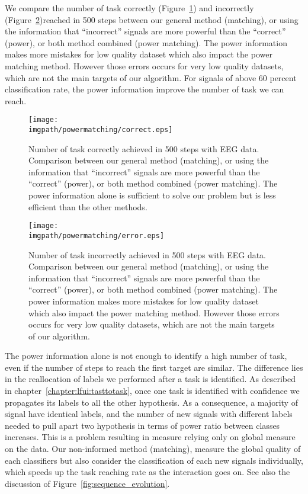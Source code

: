 We compare the number of task correctly (Figure~\ref{fig:nCorrect_powermatching}) and incorrectly (Figure~\ref{fig:nWrongEEG_powermatching})reached in 500 steps between our general method (matching), or using the information that ``incorrect'' signals are more powerful than the ``correct'' (power), or both method combined (power matching). The power information makes more mistakes for low quality dataset which also impact the power matching method. However those errors occurs for very low quality datasets, which are not the main targets of our algorithm. For signals of above 60 percent classification rate, the power information improve the number of task we can reach. 

\begin{figure}[!ht]
\centering
\texttt{[image: \\imgpath/powermatching/correct.eps]}
\caption{Number of task correctly achieved in 500 steps with EEG data. Comparison between our general method (matching), or using the information that ``incorrect'' signals are more powerful than the ``correct'' (power), or both method combined (power matching). The power information alone is sufficient to solve our problem but is less efficient than the other methods.}
\label{fig:nCorrect_powermatching}
\end{figure} 

\begin{figure}[!ht]
\centering
\texttt{[image: \\imgpath/powermatching/error.eps]}
\caption{Number of task incorrectly achieved in 500 steps with EEG data. Comparison between our general method (matching), or using the information that ``incorrect'' signals are more powerful than the ``correct'' (power), or both method combined (power matching). The power information makes more mistakes for low quality dataset which also impact the power matching method. However those errors occurs for very low quality datasets, which are not the main targets of our algorithm.}
\label{fig:nWrongEEG_powermatching}
\end{figure} 


The power information alone is not enough to identify a high number of task, even if the number of steps to reach the first target are similar. The difference lies in the reallocation of labels we performed after a task is identified. As described in chapter~\ref{chapter:lfui:tasttotask}, once one task is identified with confidence we propagates its labels to all the other hypothesis. As a consequence, a majority of signal have identical labels, and the number of new signals with different labels needed to pull apart two hypothesis in terms of power ratio between classes increases. This is a problem resulting in measure relying only on global measure on the data. Our non-informed method (matching), measure the global quality of each classifiers but also consider the classification of each new signals individually, which speeds up the task reaching rate as the interaction goes on. See also the discussion of Figure~\ref{fig:sequence_evolution}.


